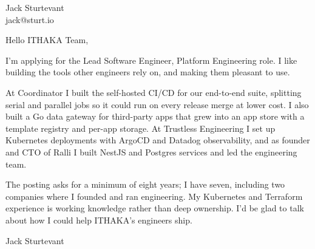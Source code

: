 \documentclass[11pt]{article}
\begin{document}
\raggedright

{\namefont\fontsize{20pt}{24pt}\selectfont Jack Sturtevant}\\[-0.3em]
jack@sturt.io

\vspace{1.2em}

Hello ITHAKA Team,

I'm applying for the Lead Software Engineer, Platform Engineering role. I like building the tools other engineers rely on, and making them pleasant to use.

At Coordinator I built the self-hosted CI/CD for our end-to-end suite, splitting serial and parallel jobs so it could run on every release merge at lower cost. I also built a Go data gateway for third-party apps that grew into an app store with a template registry and per-app storage. At Trustless Engineering I set up Kubernetes deployments with ArgoCD and Datadog observability, and as founder and CTO of Ralli I built NestJS and Postgres services and led the engineering team.

The posting asks for a minimum of eight years; I have seven, including two companies where I founded and ran engineering. My Kubernetes and Terraform experience is working knowledge rather than deep ownership. I'd be glad to talk about how I could help ITHAKA's engineers ship.

\vspace{0.6em}
Jack Sturtevant
\end{document}
